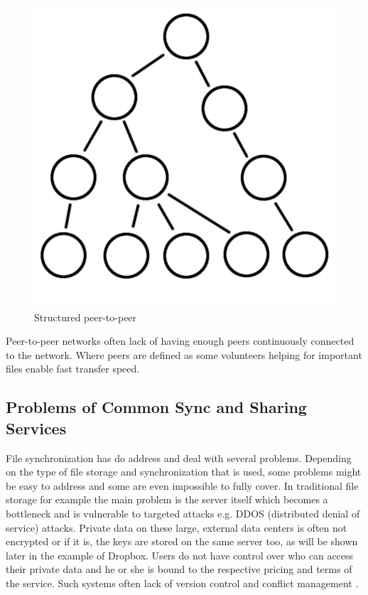 \begin{enumerate}
\begin{figure}[H]
\begin{center}
		\includegraphics[scale=0.2]{Talk5/structured_p2p.PNG}
		\end{center}
		\caption{Structured peer-to-peer}
		\label{structured_p2p}
	\end{figure}
\end{enumerate}

Peer-to-peer networks often lack of having enough peers continuously connected to the network. Where peers are defined as some volunteers helping for important files enable fast transfer speed.

\subsection{Problems of Common Sync and Sharing Services}
File synchronization has do address and deal with several problems. Depending on the type of file storage and synchronization that is used, some problems might be easy to address and some are even impossible to fully cover. In traditional file storage for example the main problem is the server itself which becomes a bottleneck and is vulnerable to targeted attacks e.g. DDOS (distributed denial of service) attacks. Private data on these large, external data centers is often not encrypted or if it is, the keys are stored on the same server too, as will be shown later in the example of Dropbox. Users do not have control over who can access their private data and he or she is bound to the respective pricing and terms of the service. Such systems often lack of version control and conflict management \cite{hive2hive}.

